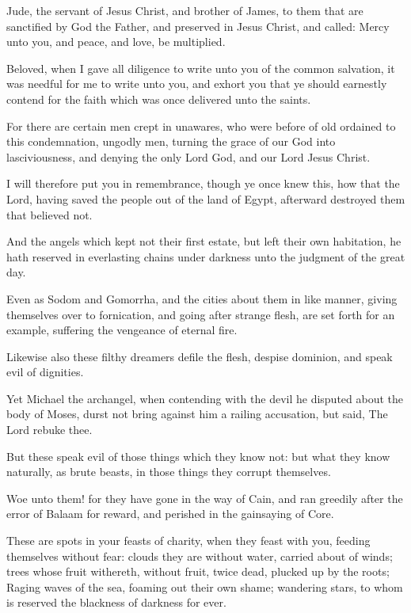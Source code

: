\Chapter
\Verse Jude, the servant of Jesus Christ, and brother of James, to them that are sanctified by God the Father, and preserved in Jesus Christ, and called: \Verse Mercy unto you, and peace, and love, be multiplied.

\Verse Beloved, when I gave all diligence to write unto you of the common salvation, it was needful for me to write unto you, and exhort you that ye should earnestly contend for the faith which was once delivered unto the saints.

\Verse For there are certain men crept in unawares, who were before of old ordained to this condemnation, ungodly men, turning the grace of our God into lasciviousness, and denying the only Lord God, and our Lord Jesus Christ.

\Verse I will therefore put you in remembrance, though ye once knew this, how that the Lord, having saved the people out of the land of Egypt, afterward destroyed them that believed not.

\Verse And the angels which kept not their first estate, but left their own habitation, he hath reserved in everlasting chains under darkness unto the judgment of the great day.

\Verse Even as Sodom and Gomorrha, and the cities about them in like manner, giving themselves over to fornication, and going after strange flesh, are set forth for an example, suffering the vengeance of eternal fire.

\Verse Likewise also these filthy dreamers defile the flesh, despise dominion, and speak evil of dignities.

\Verse Yet Michael the archangel, when contending with the devil he disputed about the body of Moses, durst not bring against him a railing accusation, but said, The Lord rebuke thee.

\Verse But these speak evil of those things which they know not: but what they know naturally, as brute beasts, in those things they corrupt themselves.

\Verse Woe unto them! for they have gone in the way of Cain, and ran greedily after the error of Balaam for reward, and perished in the gainsaying of Core.

\Verse These are spots in your feasts of charity, when they feast with you, feeding themselves without fear: clouds they are without water, carried about of winds; trees whose fruit withereth, without fruit, twice dead, plucked up by the roots; \Verse Raging waves of the sea, foaming out their own shame; wandering stars, to whom is reserved the blackness of darkness for ever.

